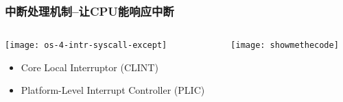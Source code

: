 \begin{frame}[plain,t]
	\frametitle{中断处理机制--让CPU能响应中断}
	\begin{columns}
		
		\begin{column}{0.4\textwidth}
			\centering
			\texttt{[image: os-4-intr-syscall-except]}
			\begin{itemize} \small
				\item Core Local	Interruptor (CLINT)
				\item Platform-Level Interrupt Controller (PLIC)
			\end{itemize}
			
		\end{column}
		
		\begin{column}{0.6\textwidth}
			
			\centering
			
			\texttt{[image: showmethecode]}
		
		\end{column}
		
	\end{columns}
	
\end{frame}
